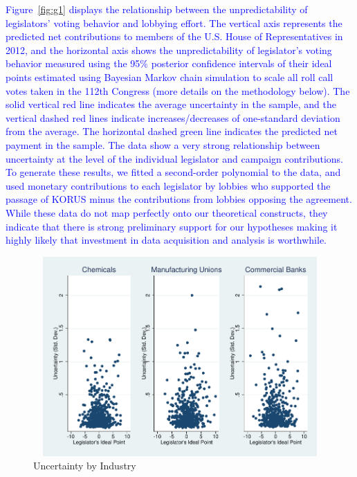 \documentclass[12pt]{article}
\begin{document}
\textcolor{blue}{Figure~\ref{fig:g1} displays the relationship between the unpredictability of legislators' voting behavior and lobbying effort. The vertical axis represents the predicted net contributions to members of the U.S. House of Representatives in 2012, and the horizontal axis shows the unpredictability of legislator's voting behavior measured using the 95$\%$ posterior confidence intervals of their ideal points estimated using Bayesian Markov chain simulation to scale all roll call votes taken in the 112th Congress (more details on the methodology below). The solid vertical red line indicates the average uncertainty in the sample, and the vertical dashed red lines indicate increases/decreases of one-standard deviation from the average. The horizontal dashed green line indicates the predicted net payment in the sample. The data show a very strong relationship between uncertainty at the level of the individual legislator and campaign contributions. To generate these results, we fitted a second-order polynomial to the data, and used monetary contributions to each legislator by lobbies who supported the passage of KORUS minus the contributions from lobbies opposing the agreement. While these data do not map perfectly onto our theoretical constructs, they indicate that there is strong preliminary support for our hypotheses making it highly likely that investment in data acquisition and analysis is worthwhile.}

\begin{figure}
\begin{center}
\includegraphics[height=3in, width=6.5in]{NSF_combined_graph.pdf}
\end{center}
\caption{Uncertainty by Industry\label{fig:combined}}
\end{figure}
\end{document}
